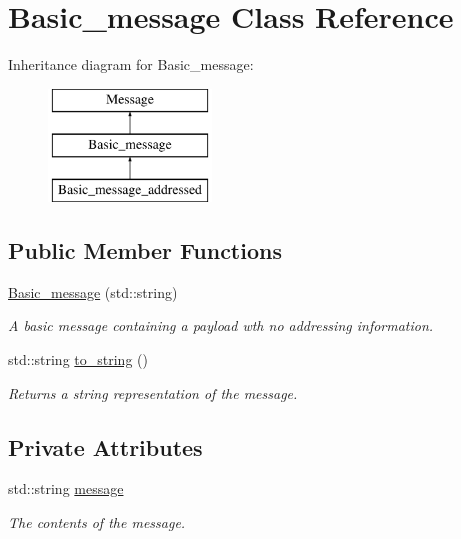 \hypertarget{class_basic__message}{}\section{Basic\+\_\+message Class Reference}
\label{class_basic__message}
Inheritance diagram for Basic\+\_\+message\+:\begin{figure}[H]
\begin{center}
\leavevmode
\includegraphics[height=3.000000cm]{class_basic__message}
\end{center}
\end{figure}
\subsection*{Public Member Functions}
\begin{DoxyCompactItemize}
\item 
\hyperlink{class_basic__message_a4fcd1befdfc1b20b042506821fd04177}{Basic\+\_\+message} (std\+::string)\hypertarget{class_basic__message_a4fcd1befdfc1b20b042506821fd04177}{}\label{class_basic__message_a4fcd1befdfc1b20b042506821fd04177}

\begin{DoxyCompactList}\small\item\em A basic message containing a payload wth no addressing information. \end{DoxyCompactList}\item 
std\+::string \hyperlink{class_basic__message_afe08455d205cb5c449dc756edef987cf}{to\+\_\+string} ()\hypertarget{class_basic__message_afe08455d205cb5c449dc756edef987cf}{}\label{class_basic__message_afe08455d205cb5c449dc756edef987cf}

\begin{DoxyCompactList}\small\item\em Returns a string representation of the message. \end{DoxyCompactList}\end{DoxyCompactItemize}
\subsection*{Private Attributes}
\begin{DoxyCompactItemize}
\item 
std\+::string \hyperlink{class_basic__message_a2b5245bca6f105c211b1b0f404b64c1c}{message}\hypertarget{class_basic__message_a2b5245bca6f105c211b1b0f404b64c1c}{}\label{class_basic__message_a2b5245bca6f105c211b1b0f404b64c1c}

\begin{DoxyCompactList}\small\item\em The contents of the message. \end{DoxyCompactList}\end{DoxyCompactItemize}


